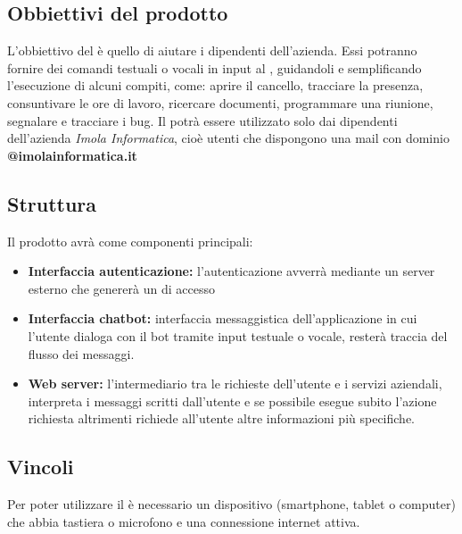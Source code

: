 \subsection{Obbiettivi del prodotto}
L'obbiettivo del  è quello di aiutare i dipendenti dell'azienda. Essi potranno fornire dei comandi testuali o vocali in input al  , guidandoli e semplificando l'esecuzione di alcuni compiti, come: aprire il cancello, tracciare la presenza, 
consuntivare le ore di lavoro, ricercare documenti, programmare una riunione, segnalare e 
tracciare i bug. \newline
Il  potrà essere utilizzato solo dai dipendenti dell'azienda \textit{Imola Informatica}, cioè utenti che dispongono una
mail con dominio \textbf{@imolainformatica.it}

\subsection{Struttura}
Il prodotto avrà come componenti principali:
\begin{itemize}
    \item \textbf{Interfaccia autenticazione:} l'autenticazione avverrà mediante un server esterno che 
                genererà un  di accesso
    \item \textbf{Interfaccia chatbot:} interfaccia messaggistica dell'applicazione in cui l'utente dialoga 
                con il bot tramite input testuale o vocale, resterà traccia del flusso dei messaggi.
    \item \textbf{Web server:} l'intermediario tra le richieste dell'utente e i servizi aziendali, interpreta 
                i messaggi scritti dall'utente e se possibile esegue subito l'azione richiesta altrimenti 
                richiede all'utente altre informazioni più specifiche.
\end{itemize}

\subsection{Vincoli}
Per poter utilizzare il  è necessario un dispositivo (smartphone, tablet o computer) che 
abbia tastiera o microfono e una connessione internet attiva.

